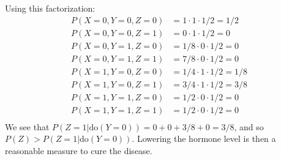 \documentclass{article}
\begin{document}
Using this factorization:
\begin{align*}
    P(X = 0, Y = 0, Z = 0) & = 1 \cdot 1 \cdot 1/2 = 1/2 \\
    P(X = 0, Y = 0, Z = 1) & = 0 \cdot 1 \cdot 1/2 = 0 \\
    P(X = 0, Y = 1, Z = 0) & = 1/8 \cdot 0 \cdot 1/2 = 0 \\
    P(X = 0, Y = 1, Z = 1) & = 7/8 \cdot 0 \cdot 1/2 = 0 \\
    P(X = 1, Y = 0, Z = 0) & = 1/4 \cdot 1 \cdot 1/2 = 1/8 \\
    P(X = 1, Y = 0, Z = 1) & = 3/4 \cdot 1 \cdot 1/2 = 3/8 \\
    P(X = 1, Y = 1, Z = 0) & = 1/2 \cdot 0 \cdot 1/2 = 0 \\
    P(X = 1, Y = 1, Z = 1) & = 1/2 \cdot 0 \cdot 1/2 = 0 \\
\end{align*}
We see that $P(Z = 1 | \mathrm{do}(Y = 0)) = 0 + 0 + 3/8 + 0 = 3/8$, and so $P(Z) > P(Z = 1 | \mathrm{do}(Y = 0))$. Lowering the hormone level is then a reasonable measure to cure the disease.
\end{document}
